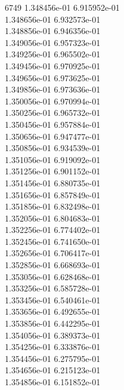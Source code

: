 6749	1.348456e-01	6.915952e-01	\\ 	1.348656e-01	6.932573e-01	\\ 	1.348856e-01	6.946356e-01	\\ 	1.349056e-01	6.957323e-01	\\ 	1.349256e-01	6.965502e-01	\\ 	1.349456e-01	6.970925e-01	\\ 	1.349656e-01	6.973625e-01	\\ 	1.349856e-01	6.973636e-01	\\ 	1.350056e-01	6.970994e-01	\\ 	1.350256e-01	6.965732e-01	\\ 	1.350456e-01	6.957884e-01	\\ 	1.350656e-01	6.947477e-01	\\ 	1.350856e-01	6.934539e-01	\\ 	1.351056e-01	6.919092e-01	\\ 	1.351256e-01	6.901152e-01	\\ 	1.351456e-01	6.880735e-01	\\ 	1.351656e-01	6.857849e-01	\\ 	1.351856e-01	6.832498e-01	\\ 	1.352056e-01	6.804683e-01	\\ 	1.352256e-01	6.774402e-01	\\ 	1.352456e-01	6.741650e-01	\\ 	1.352656e-01	6.706417e-01	\\ 	1.352856e-01	6.668693e-01	\\ 	1.353056e-01	6.628468e-01	\\ 	1.353256e-01	6.585728e-01	\\ 	1.353456e-01	6.540461e-01	\\ 	1.353656e-01	6.492655e-01	\\ 	1.353856e-01	6.442295e-01	\\ 	1.354056e-01	6.389373e-01	\\ 	1.354256e-01	6.333876e-01	\\ 	1.354456e-01	6.275795e-01	\\ 	1.354656e-01	6.215123e-01	\\ 	1.354856e-01	6.151852e-01	\\ \hline
